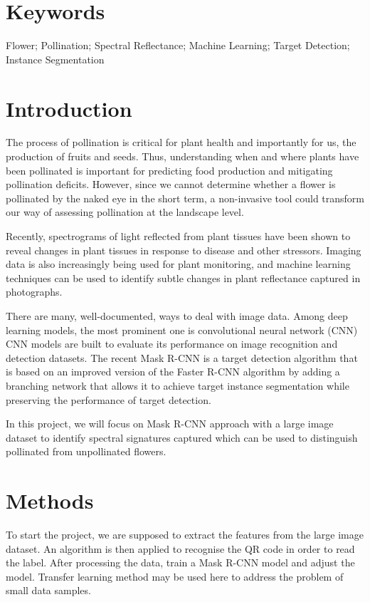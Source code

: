 \documentclass[11pt,a4paper]{article}
\begin{document}
\begin{spacing}{1.5}

\linenumbers

\renewcommand\thesection{\arabic{section}}

    
    
\section{Keywords}
Flower; Pollination; Spectral Reflectance; Machine Learning; Target Detection; Instance Segmentation


\section{Introduction}
The process of pollination is critical for plant health and importantly for us, the production of fruits and seeds. Thus, understanding when and where plants have been pollinated is important for predicting food production and mitigating pollination deficits. However, since we cannot determine whether a flower is pollinated by the naked eye in the short term, a non-invasive tool could transform our way of assessing pollination at the landscape level.

Recently, spectrograms of light reflected from plant tissues have been shown to reveal changes in plant tissues in response to disease and other stressors. Imaging data is also increasingly being used for plant monitoring, and machine learning techniques can be used to identify subtle changes in plant reflectance captured in photographs.

There are many, well-documented, ways to deal with image data. \citep{9356353} Among deep learning models, the most prominent one is convolutional neural network (CNN) \citep{222795} CNN models are built to evaluate its performance on image recognition and detection datasets. \citep{8703316} The recent Mask R-CNN is a target detection algorithm that is based on an improved version of the Faster R-CNN algorithm by adding a branching network that allows it to achieve target instance segmentation while preserving the performance of target detection.\citep{He_2017_ICCV}

In this project, we will focus on Mask R-CNN approach with a large image dataset to identify spectral signatures captured which can be used to distinguish pollinated from unpollinated flowers.

\section{Methods}
To start the project, we are supposed to extract the features from the large image dataset. An algorithm is then applied to recognise the QR code in order to read the label. After processing the data, train a Mask R-CNN model and adjust the model. Transfer learning method may be used here to address the problem of small data samples.\citep{KHAN202158}


\end{spacing}
\end{document}
